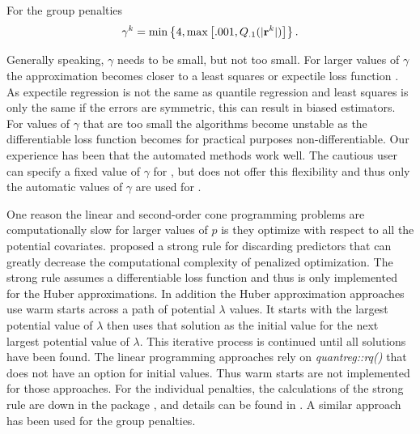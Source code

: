 \documentclass[article]{rqPenVignette}%
\newcommand{\vr}{{\bf r}}
\begin{document}
For the group penalties%
\begin{equation*}
\gamma^k = \min\left\{4, \max\left[.001, Q_{.1}(|\vr^k|) \right] \right\}.
\end{equation*}

Generally speaking, $\gamma$ needs to be small, but not too small. For larger values of $\gamma$ the approximation becomes closer to a least squares or expectile loss function \citep{expectile}. As expectile regression is not the same as quantile regression and least squares is only the same if the errors are symmetric, this can result in biased estimators. For values of $\gamma$ that are too small the algorithms become unstable as the differentiable loss function becomes for practical purposes non-differentiable. Our experience has been that the automated methods work well. The cautious user can specify a fixed value of  $\gamma$ for , but  does not offer this flexibility and thus only the automatic values of $\gamma$ are used for . 

One reason the linear and second-order cone programming problems are computationally slow for larger values of $p$ is they optimize with respect to all the potential covariates. \citet{tibshirani2012strong} proposed a strong rule for discarding predictors that can greatly decrease the computational complexity of penalized optimization. The strong rule assumes a differentiable loss function and thus is only implemented for the Huber approximations. In addition the Huber approximation approaches use warm starts across a path of potential $\lambda$ values. It starts with the largest potential value of $\lambda$ then uses that solution as the initial value for the next largest potential value of $\lambda$. This iterative process is continued until all solutions have been found. The linear programming approaches rely on \emph{quantreg::rq()} that does not have an option for initial values. Thus warm starts are not implemented for those approaches. For the individual penalties, the calculations of the strong rule are down in the package , and details can be found in \citet{huber_cd}. A similar approach has been used for the group penalties. %
\end{document}
